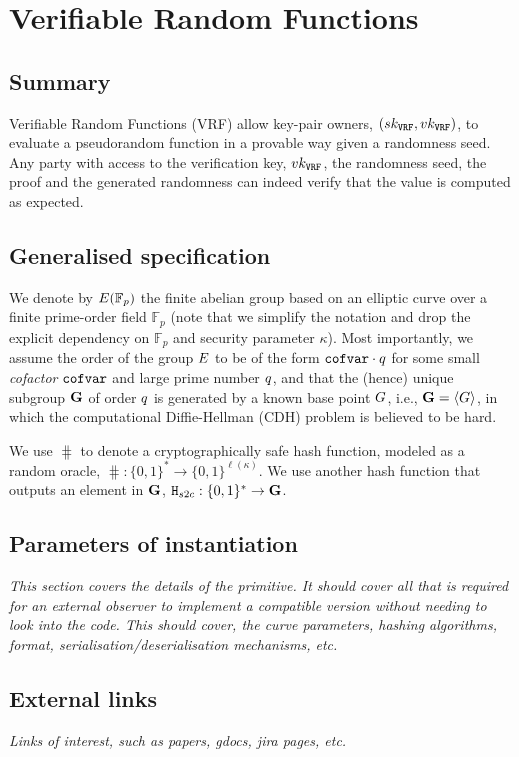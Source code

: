 \section{Verifiable Random Functions}
\subsection{Summary}
\newcommand{\sk}{sk}
\newcommand{\vrf}{\texttt{VRF}}
\newcommand{\vrfsk}{\sk_{\vrf}}
\newcommand{\vrfvk}{\vk_{\vrf}}


Verifiable Random Functions (VRF) allow key-pair owners, $(\vrfsk, \vrfvk)$, 
to evaluate a pseudorandom function in a provable way given a randomness seed. 
Any party with access to the verification key, $\vrfvk$, the
randomness seed, the proof and the generated randomness can indeed verify 
that the value is computed as expected. 
\subsection{Generalised specification}
We denote by $E(\mathbb{F}_p)$ the finite abelian group based on an elliptic curve over a finite prime-order field $\mathbb{F}_p$ (note that we simplify the notation and drop the explicit dependency on $\mathbb{F}_p$ and security parameter $\kappa$). Most importantly, we assume the order of the group $E$ to be of the form $\texttt{cofvar}\cdot q$ for some small \emph{cofactor} $\texttt{cofvar}$ and large prime number $q$, and that the (hence) unique subgroup $\mathbf{G}$ of order $q$ is generated by a known base point $G$, i.e., $\mathbf{G} = \langle G\rangle$,  in which the computational Diffie-Hellman (CDH) problem is believed to be hard.

We use $\hash$ to denote a cryptographically safe hash function, modeled as a random oracle, $\hash: \{0,1\}^*\rightarrow\{0,1\}^{\ell(\kappa)}$. We use another hash function that outputs an element in $\mathbf{G}$, $\texttt{H}_{s2c}: \{0,1\}^* \to \mathbf{G}$. 



\subsection{Parameters of instantiation}
\textit{This section covers the details of the primitive. It should cover all that is required for an external observer to implement a compatible version without needing to look into the code. This should cover, the curve parameters, hashing algorithms, format, serialisation/deserialisation mechanisms, etc.}

\subsection{External links}
\textit{Links of interest, such as papers, gdocs, jira pages, etc.}